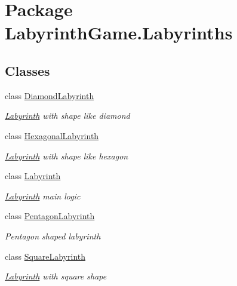 \hypertarget{namespace_labyrinth_game_1_1_labyrinths}{\section{Package Labyrinth\+Game.\+Labyrinths}
\label{namespace_labyrinth_game_1_1_labyrinths}
}
\subsection*{Classes}
\begin{DoxyCompactItemize}
\item 
class \hyperlink{class_labyrinth_game_1_1_labyrinths_1_1_diamond_labyrinth}{Diamond\+Labyrinth}
\begin{DoxyCompactList}\small\item\em \hyperlink{class_labyrinth_game_1_1_labyrinths_1_1_labyrinth}{Labyrinth} with shape like diamond \end{DoxyCompactList}\item 
class \hyperlink{class_labyrinth_game_1_1_labyrinths_1_1_hexagonal_labyrinth}{Hexagonal\+Labyrinth}
\begin{DoxyCompactList}\small\item\em \hyperlink{class_labyrinth_game_1_1_labyrinths_1_1_labyrinth}{Labyrinth} with shape like hexagon \end{DoxyCompactList}\item 
class \hyperlink{class_labyrinth_game_1_1_labyrinths_1_1_labyrinth}{Labyrinth}
\begin{DoxyCompactList}\small\item\em \hyperlink{class_labyrinth_game_1_1_labyrinths_1_1_labyrinth}{Labyrinth} main logic \end{DoxyCompactList}\item 
class \hyperlink{class_labyrinth_game_1_1_labyrinths_1_1_pentagon_labyrinth}{Pentagon\+Labyrinth}
\begin{DoxyCompactList}\small\item\em Pentagon shaped labyrinth \end{DoxyCompactList}\item 
class \hyperlink{class_labyrinth_game_1_1_labyrinths_1_1_square_labyrinth}{Square\+Labyrinth}
\begin{DoxyCompactList}\small\item\em \hyperlink{class_labyrinth_game_1_1_labyrinths_1_1_labyrinth}{Labyrinth} with square shape \end{DoxyCompactList}\end{DoxyCompactItemize}
